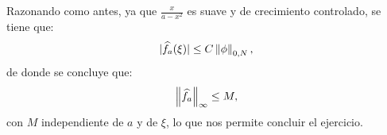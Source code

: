 \begin{homeworkProblem}
\begin{solution}
\begin{itemize}
      Razonando como antes, ya que $\frac{x}{a - x^2}$ es suave y de crecimiento controlado, se tiene que:
      \begin{align*}
        |\widehat{f_a}(\xi)| \leq C \left\|\phi\right\|_{0,N},
      \end{align*}
      de donde se concluye que:
      \begin{align*}
        \left\|\widehat{f_a}\right\|_{\infty} \leq M,
      \end{align*}
      con $M$ independiente de $a$ y de $\xi$, lo que nos permite concluir el ejercicio.
    \end{itemize}
  \end{solution}
\end{homeworkProblem}
